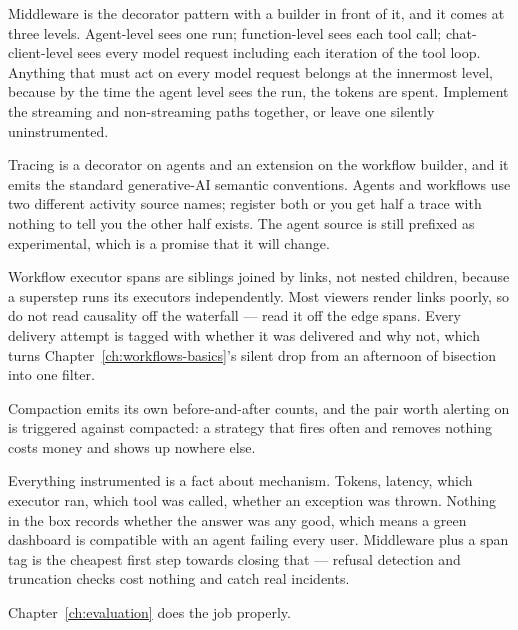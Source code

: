 Middleware is the decorator pattern with a builder in front of it, and it comes
at three levels. Agent-level sees one run; function-level sees each tool call;
chat-client-level sees every model request including each iteration of the tool
loop. Anything that must act on every model request belongs at the innermost
level, because by the time the agent level sees the run, the tokens are spent.
Implement the streaming and non-streaming paths together, or leave one silently
uninstrumented.

Tracing is a decorator on agents and an extension on the workflow builder, and it
emits the standard generative-AI semantic conventions. Agents and workflows use
two different activity source names; register both or you get half a trace with
nothing to tell you the other half exists. The agent source is still prefixed as
experimental, which is a promise that it will change.

Workflow executor spans are siblings joined by links, not nested children,
because a superstep runs its executors independently. Most viewers render links
poorly, so do not read causality off the waterfall --- read it off the edge spans.
Every delivery attempt is tagged with whether it was delivered and why not, which
turns Chapter~\ref{ch:workflows-basics}'s silent drop from an afternoon of
bisection into one filter.

Compaction emits its own before-and-after counts, and the pair worth alerting on
is triggered against compacted: a strategy that fires often and removes nothing
costs money and shows up nowhere else.

Everything instrumented is a fact about mechanism. Tokens, latency, which
executor ran, which tool was called, whether an exception was thrown. Nothing in
the box records whether the answer was any good, which means a green dashboard is
compatible with an agent failing every user. Middleware plus a span tag is the
cheapest first step towards closing that --- refusal detection and truncation
checks cost nothing and catch real incidents.

Chapter~\ref{ch:evaluation} does the job properly.
